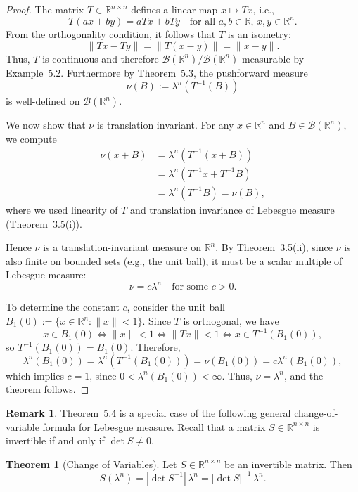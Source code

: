\documentclass[12pt]{article}
\theoremstyle{definition}
\newtheorem{theorem}{Theorem}[section]
\newtheorem{remark}{Remark}[section]
\begin{document}
\begin{proof}
The matrix \( T \in \mathbb{R}^{n \times n} \) defines a linear map \( x \mapsto Tx \), i.e.,
\[
T(ax + by) = aTx + bTy \quad \text{for all } a, b \in \mathbb{R}, \, x, y \in \mathbb{R}^n.
\]
From the orthogonality condition, it follows that \( T \) is an isometry:
\[
\|Tx - Ty\| = \|T(x - y)\| = \|x - y\|.
\]
Thus, \( T \) is continuous and therefore \( \mathcal{B}(\mathbb{R}^n)/\mathcal{B}(\mathbb{R}^n) \)-measurable by Example~5.2. Furthermore by Theorem~5.3, the pushforward measure
\[
\nu(B) := \lambda^n(T^{-1}(B))
\]
is well-defined on \( \mathcal{B}(\mathbb{R}^n) \).

We now show that \( \nu \) is translation invariant. For any \( x \in \mathbb{R}^n \) and \( B \in \mathcal{B}(\mathbb{R}^n) \), we compute
\begin{align*}
\nu(x + B) &= \lambda^n\left(T^{-1}(x + B)\right) \\
&= \lambda^n\left(T^{-1}x + T^{-1}B\right) \\
&= \lambda^n\left(T^{-1}B\right) = \nu(B),
\end{align*}
where we used linearity of \( T \) and translation invariance of Lebesgue measure (Theorem~3.5(i)).

Hence \( \nu \) is a translation-invariant measure on \( \mathbb{R}^n \). By Theorem~3.5(ii), since \( \nu \) is also finite on bounded sets (e.g., the unit ball), it must be a scalar multiple of Lebesgue measure:
\[
\nu = c \lambda^n \quad \text{for some } c > 0.
\]

To determine the constant \( c \), consider the unit ball \( B_1(0) := \{ x \in \mathbb{R}^n : \|x\| < 1 \} \). Since \( T \) is orthogonal, we have
\[
x \in B_1(0) \iff \|x\| < 1 \iff \|Tx\| < 1 \iff x \in T^{-1}(B_1(0)),
\]
so \( T^{-1}(B_1(0)) = B_1(0) \). Therefore,
\[
\lambda^n(B_1(0)) = \lambda^n(T^{-1}(B_1(0))) = \nu(B_1(0)) = c \lambda^n(B_1(0)),
\]
which implies \( c = 1 \), since \( 0 < \lambda^n(B_1(0)) < \infty \). Thus, \( \nu = \lambda^n \), and the theorem follows.
\end{proof}

\medskip
\begin{remark}
Theorem~5.4 is a special case of the following general change-of-variable formula for Lebesgue measure. Recall that a matrix \( S \in \mathbb{R}^{n \times n} \) is invertible if and only if \( \det S \neq 0 \).
\end{remark}

\medskip
\begin{theorem}[Change of Variables]
Let \( S \in \mathbb{R}^{n \times n} \) be an invertible matrix. Then
\begin{equation}
S(\lambda^n) = |\det S^{-1}| \, \lambda^n = |\det S|^{-1} \, \lambda^n. \tag{7.7}
\end{equation}
\end{theorem}
\end{document}
